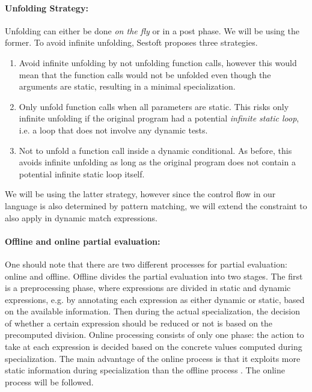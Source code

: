 \paragraph{Unfolding Strategy:} Unfolding can either be done \textit{on the fly} or in a post phase. We will be using the former. To avoid infinite unfolding, Sestoft \cite{Sestoft} proposes three strategies.
\begin{enumerate}
    \item Avoid infinite unfolding by not unfolding function calls, however this would mean that the function calls would not be unfolded even though the arguments are static, resulting in a minimal specialization.
    \item Only unfold function calls when all parameters are static. This risks only infinite unfolding if the original program had a potential \textit{infinite static loop}, i.e. a loop that does not involve any dynamic tests.
    \item Not to unfold a function call inside a dynamic conditional. As before, this avoids infinite unfolding as long as the original program does not contain a potential infinite static loop itself.
\end{enumerate}

We will be using the latter strategy, however since the control flow in our language is also determined by pattern matching, we will extend the constraint to also apply in dynamic match expressions. 

\paragraph{Offline and online partial evaluation:}
One should note that there are two different processes for partial evaluation: online and offline. Offline divides the partial evaluation into two stages. The first is a preprocessing phase, where expressions are divided in static and dynamic expressions, e.g. by annotating each expression as either dynamic or static, based on the available information. Then during the actual specialization, the decision of whether a certain expression should be reduced or not is based on the precomputed division. Online processing consists of only one phase: the action to take at each expression is decided based on the concrete values computed during specialization. The main advantage of the online process is that it exploits more static information during specialization than the offline process \cite{Sestoft}. The online process will be followed.

